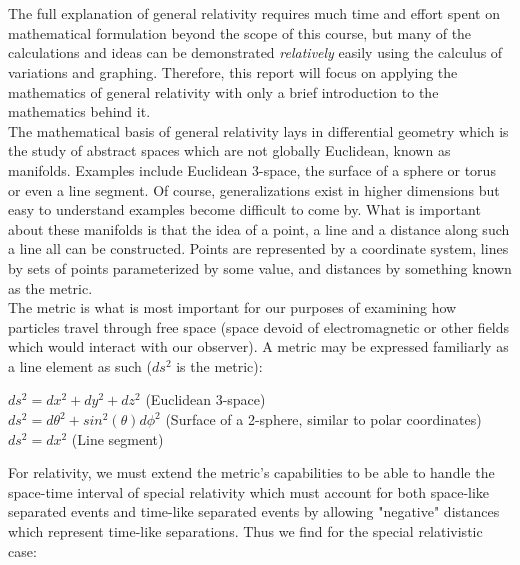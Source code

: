\documentclass[]{article}
\title{}
\author{}
\begin{document}
\section{}

The full explanation of general relativity requires much time and effort spent on mathematical formulation beyond the scope of this course, but many of the calculations and ideas can be demonstrated \textit{relatively} easily using the calculus of variations and graphing. Therefore, this report will focus on applying the mathematics of general relativity with only a brief introduction to the mathematics behind it. \\


The mathematical basis of general relativity lays in differential geometry which is the study of abstract spaces which are not globally Euclidean, known as manifolds. Examples include Euclidean 3-space, the surface of a sphere or torus or even a line segment. Of course, generalizations exist in higher dimensions but easy to understand examples become difficult to come by. What is important about these manifolds is that the idea of a point, a line and a distance along such a line all can be constructed. Points are represented by a coordinate system, lines by sets of points parameterized by some value, and distances by something known as the metric. \\

The metric is what is most important for our purposes of examining how particles travel through free space (space devoid of electromagnetic or other fields which would interact with our observer). A metric may be expressed familiarly as a line element as such ($ds^2$ is the metric): \\

\begin{center}
	$ds^2 = dx^2+dy^2+dz^2$ (Euclidean 3-space) \\
	
	$ds^2= d \theta^2 + sin^2(\theta) d \phi^2$ (Surface of a 2-sphere, similar to polar coordinates) \\
	
	$ds^2= dx^2$ (Line segment)
\end{center}

For relativity, we must extend the metric's capabilities to be able to handle the space-time interval of special relativity which must account for both space-like separated events and time-like separated events by allowing "negative" distances which represent time-like separations. Thus we find for the special relativistic case: \\
\end{document}
